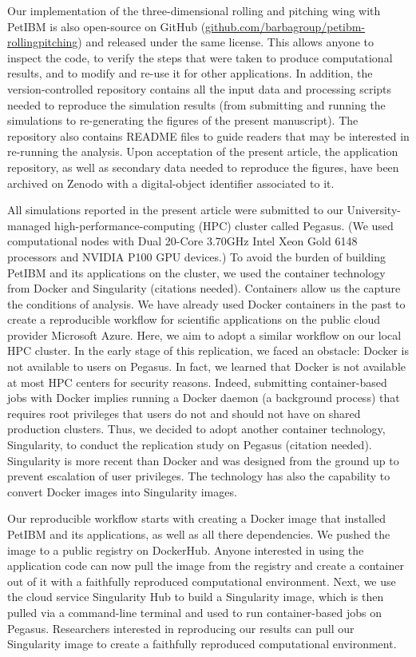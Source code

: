 Our implementation of the three-dimensional rolling and pitching wing with PetIBM is also open-source on GitHub (\url{github.com/barbagroup/petibm-rollingpitching}) and released under the same license.
This allows anyone to inspect the code, to verify the steps that were taken to produce computational results, and to modify and re-use it for other applications.
In addition, the version-controlled repository contains all the input data and processing scripts needed to reproduce the simulation results (from submitting and running the simulations to re-generating the figures of the present manuscript).
The repository also contains \textsc{README} files to guide readers that may be interested in re-running the analysis.
Upon acceptation of the present article, the application repository, as well as secondary data needed to reproduce the figures, have been archived on Zenodo with a digital-object identifier associated to it.

All simulations reported in the present article were submitted to our University-managed high-performance-computing (HPC) cluster called Pegasus.
(We used computational nodes with Dual 20-Core 3.70GHz Intel Xeon Gold 6148 processors and NVIDIA P100 GPU devices.)
To avoid the burden of building PetIBM and its applications on the cluster, we used the container technology from Docker and Singularity (citations needed).
Containers allow us the capture the conditions of analysis.
We have already used Docker containers in the past to create a reproducible workflow for scientific applications on the public cloud provider Microsoft Azure.\supercite{mesnard_barba_2020}
Here, we aim to adopt a similar workflow on our local HPC cluster.
In the early stage of this replication, we faced an obstacle: Docker is not available to users on Pegasus.
In fact, we learned that Docker is not available at most HPC centers for security reasons.
Indeed, submitting container-based jobs with Docker implies running a Docker daemon (a background process) that requires root privileges that users do not and should not have on shared production clusters.
Thus, we decided to adopt another container technology, Singularity, to conduct the replication study on Pegasus (citation needed).
Singularity is more recent than Docker and was designed from the ground up to prevent escalation of user privileges.
The technology has also the capability to convert Docker images into Singularity images.

Our reproducible workflow starts with creating a Docker image that installed PetIBM and its applications, as well as all there dependencies.
We pushed the image to a public registry on DockerHub.
Anyone interested in using the application code can now pull the image from the registry and create a container out of it with a faithfully reproduced computational environment.
Next, we use the cloud service Singularity Hub to build a Singularity image, which is then pulled via a command-line terminal and used to run container-based jobs on Pegasus.
Researchers interested in reproducing our results can pull our Singularity image to create a faithfully reproduced computational environment.

